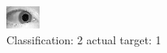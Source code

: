 \begin{figure}[h!]
\begin{center}
\includegraphics[width=0.60\columnwidth]{figures/ID1457_class_2_target_1.png}
\end{center}
\caption{ Classification: 2 actual target: 1}
\label{fig:ID1457_class_2_target_1}
\end{figure}
